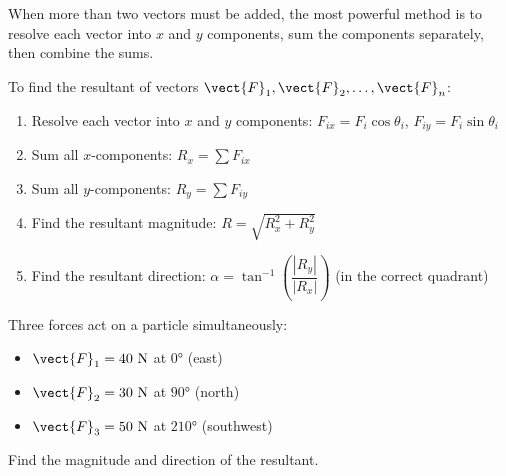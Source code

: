 When more than two vectors must be added, the most
powerful method is to resolve each vector into $x$ and $y$
components, sum the components separately, then combine
the sums.

\begin{lawbox}
To find the resultant of vectors
$\vect{F}_1, \vect{F}_2, \ldots, \vect{F}_n$:
\begin{enumerate}[noitemsep]
  \item Resolve each vector into $x$ and $y$ components:
  $F_{ix} = F_i\cos\theta_i$,
  $F_{iy} = F_i\sin\theta_i$
  \item Sum all $x$-components: $R_x = \sum F_{ix}$
  \item Sum all $y$-components: $R_y = \sum F_{iy}$
  \item Find the resultant magnitude:
  $R = \sqrt{R_x^2 + R_y^2}$
  \item Find the resultant direction:
  $\alpha = \tan^{-1}\!\left(\dfrac{|R_y|}{|R_x|}\right)$
  (in the correct quadrant)
\end{enumerate}
\end{lawbox}

\begin{examplebox}[2.6]
Three forces act on a particle simultaneously:
\begin{itemize}[noitemsep]
  \item $\vect{F}_1 = 40\ \text{N}$ at $0°$ (east)
  \item $\vect{F}_2 = 30\ \text{N}$ at $90°$ (north)
  \item $\vect{F}_3 = 50\ \text{N}$ at $210°$
  (southwest)
\end{itemize}
Find the magnitude and direction of the resultant.
\end{examplebox}


